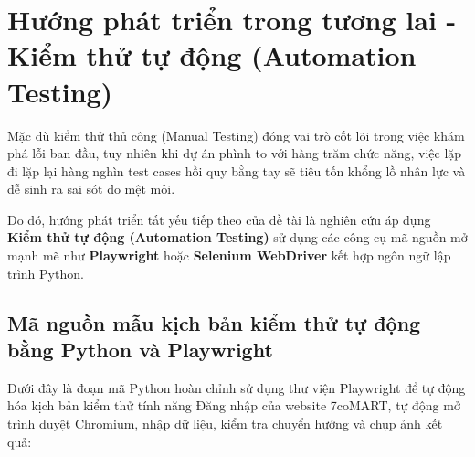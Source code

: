\section{Hướng phát triển trong tương lai - Kiểm thử tự động (Automation Testing)}
Mặc dù kiểm thử thủ công (Manual Testing) đóng vai trò cốt lõi trong việc khám phá lỗi ban đầu, tuy nhiên khi dự án phình to với hàng trăm chức năng, việc lặp đi lặp lại hàng nghìn test cases hồi quy bằng tay sẽ tiêu tốn khổng lồ nhân lực và dễ sinh ra sai sót do mệt mỏi.

Do đó, hướng phát triển tất yếu tiếp theo của đề tài là nghiên cứu áp dụng \textbf{Kiểm thử tự động (Automation Testing)} sử dụng các công cụ mã nguồn mở mạnh mẽ như \textbf{Playwright} hoặc \textbf{Selenium WebDriver} kết hợp ngôn ngữ lập trình Python.

\subsection{Mã nguồn mẫu kịch bản kiểm thử tự động bằng Python và Playwright}
Dưới đây là đoạn mã Python hoàn chỉnh sử dụng thư viện Playwright để tự động hóa kịch bản kiểm thử tính năng Đăng nhập của website 7coMART, tự động mở trình duyệt Chromium, nhập dữ liệu, kiểm tra chuyển hướng và chụp ảnh kết quả:

